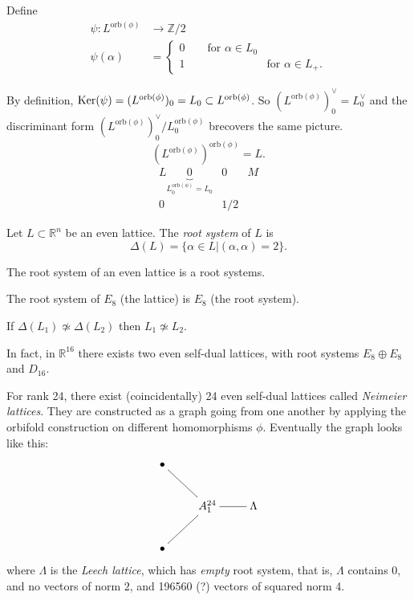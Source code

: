 Define
\begin{align*}
\psi: L^{\text{orb}(\phi)} &\longrightarrow
\mathbb{Z}/2 \\
 \psi(\alpha)&=
\begin{cases}
0\qquad \text{for }\alpha \in L_0& \\
1\qquad &\text{for }\alpha \in L_+.
\end{cases}
\end{align*}

\noindent
By definition,
 $\mathop{\mathrm{Ker}}(\psi)=(L^{\text{orb}(\phi)})_0=L_0
 \subset L^{\text{orb}(\phi)}$.
So $(L^{\text{orb}(\phi)})_0^\vee=L_0^\vee$
and the discriminant form
$(L^{\text{orb}(\phi)})_0^\vee/L^{\text{orb}
(\phi)}_0$
brecovers the same picture.
$$
(L^{\text{orb}(\phi)})^{\text{orb}(\phi)}=L.
$$
$$
\begin{matrix}
L
\underbrace{0}_{L^{\text{orb}(\phi)}_0=L_0} &
0 & M\\
0&1/2
\end{matrix}
$$
\begin{definition}
\label{definition-root-system-lattice}
Let $L \subset \mathbb{R}^n$ be an even
lattice.
The {\it root system} of $L$ is
$$
\Delta(L)=\{\alpha \in L|(\alpha,\alpha)=2\}.
$$
\end{definition}

\begin{proposition}
\label{proposition-root-syste-latti-lie}
The root system of an even lattice is a root
systems.
\end{proposition}

\begin{example}
\label{example-e8-root-system}
The root system of $E_8$ (the lattice)
is $E_8$ (the root system).
\end{example}

\noindent
If $\Delta(L_1) \not \simeq \Delta(L_2)$
then $L_1\not\simeq L_2$.

In fact, in $\mathbb{R}^{16}$ there exists
two even self-dual lattices,
with root systems $E_8 \oplus E_8$ and
$D_{16}$.

For rank 24, there exist (coincidentally) 24
even self-dual lattices
called  {\it Neimeier lattices}.
They are constructed as a graph going from
one another
by applying the orbifold construction on
different homomorphisms $\phi$.
Eventually the graph looks like this:
$$
\xymatrix{
\bullet \ar@{-}[dr]\\
& A_1^{24}\ar@{-}[r]& \Lambda\\
\bullet \ar@{-}[ur]
}
$$
where $\Lambda$ is the {\it Leech lattice},
which has {\it empty} root system,
that is, $\Lambda$ contains $0$, and no
vectors of norm $2$,
and 196560 (?) vectors of squared norm 4.

